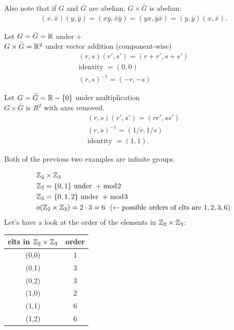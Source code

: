\begin{proposition}
    \noindent Also note that if $G$ and $\bar{G}$ are abelian, $G\times \bar{G}$ is abelian:
        \begin{align}
            (x,\bar{x})(y,\bar{y})=(xy,\bar{x}\bar{y}) = (yx,\bar{y}\bar{x})=(y,\bar{y})(x,\bar{x}). \nonumber
        \end{align}
\end{proposition}

\begin{example}[HW\#5 Problem 4]
    Let $G=\bar{G}={\mathbb{R}}$ under $+$ \\
    $G\times \bar{G}= {\mathbb{R}}^2$ under vector addition (component-wise) \\
    \begin{align}
        (r,s)(r',s')=(r+r',s+s') \nonumber \\
        \text{identity }= (0,0) \nonumber \\
        (r,s)^{-1}= (-r,-s) \nonumber
    \end{align}
\end{example}
\begin{example}
    Let $G=\bar{G}={\mathbb{R}}-\{0\}$ under multiplication \\
    $G\times \bar{G}$ is $R^2$ with axes removed. \\
    \begin{align}
        (r,s)(r',s')=(rr',ss') \nonumber \\
        (r,s)^{-1} = (1/r,1/s) \nonumber \\
        \text{identity }= (1,1). \nonumber
    \end{align}
\end{example}
\noindent Both of the previous two examples are infinite groups.
\begin{example}
\begin{align}
    &{\mathbb{Z}}_2\times {\mathbb{Z}}_3 \nonumber \\
    &{\mathbb{Z}}_2 = \{0,1\} \text{ under }+\bmod 2 \nonumber \\
    &{\mathbb{Z}}_3 = \{0,1,2\} \text{ under }+\bmod 3 \nonumber \\
    &o({\mathbb{Z}}_2\times {\mathbb{Z}}_3)= 2\cdot 3 = 6  \ \  (\leftarrow \text{possible orders of elts are } 1, 2, 3, 6)\nonumber
\end{align}
Let's have a look at the order of the elements in ${\mathbb{Z}}_2\times {\mathbb{Z}}_3$:
\begin{table}[h!]
    \centering
    \begin{tabular}{c|c}
         elts in ${\mathbb{Z}}_2\times {\mathbb{Z}}_3$& order   \\ \hline
         (0,0) & 1 \\
         (0,1) & 3 \\
         (0,2) & 3 \\
         (1,0) & 2 \\
         (1,1) & 6 \\
         (1,2) & 6
    \end{tabular}
    \label{tab:elts_Z2_cross_Z3}
\end{table}
\end{example}

